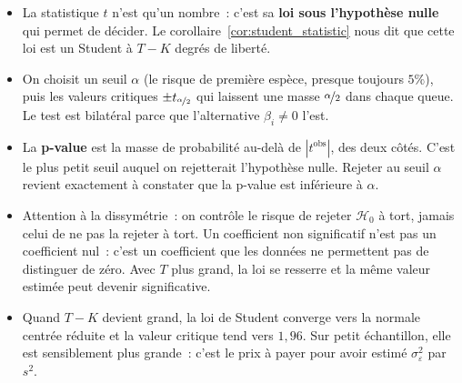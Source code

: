 \documentclass[10pt,a4paper]{article}
\theoremstyle{definition}
\renewcommand{\newline}{\unskip\par\vspace{1.5pt}}
\begin{document}
\begin{notes}

  \begin{itemize}

  \item La statistique $t$ n'est qu'un nombre~: c'est sa \textbf{loi sous l'hypothèse
    nulle} qui permet de décider. Le corollaire~\ref{cor:student_statistic} nous dit
    que cette loi est un Student à $T-K$ degrés de liberté.\newline

  \item On choisit un seuil $\alpha$ (le risque de première espèce, presque toujours
    $5\%$), puis les valeurs critiques $\pm t_{\nicefrac{\alpha}{2}}$ qui laissent une
    masse $\nicefrac{\alpha}{2}$ dans chaque queue. Le test est bilatéral parce que
    l'alternative $\beta_i\neq 0$ l'est.\newline

  \item La \textbf{p-value} est la masse de probabilité au-delà de
    $|t^{\text{obs}}|$, des deux côtés. C'est le plus petit seuil auquel on rejetterait
    l'hypothèse nulle. Rejeter au seuil $\alpha$ revient exactement à constater que la
    p-value est inférieure à $\alpha$.\newline

  \item Attention à la dissymétrie~: on contrôle le risque de rejeter $\mathcal H_0$ à
    tort, jamais celui de ne pas la rejeter à tort. Un coefficient non significatif
    n'est pas un coefficient nul~: c'est un coefficient que les données ne permettent
    pas de distinguer de zéro. Avec $T$ plus grand, la loi se resserre et la même
    valeur estimée peut devenir significative.\newline

  \item Quand $T-K$ devient grand, la loi de Student converge vers la normale centrée
    réduite et la valeur critique tend vers $1{,}96$. Sur petit échantillon, elle est
    sensiblement plus grande~: c'est le prix à payer pour avoir estimé
    $\sigma_{\varepsilon}^2$ par $s^2$.

  \end{itemize}

\end{notes}
\end{document}
